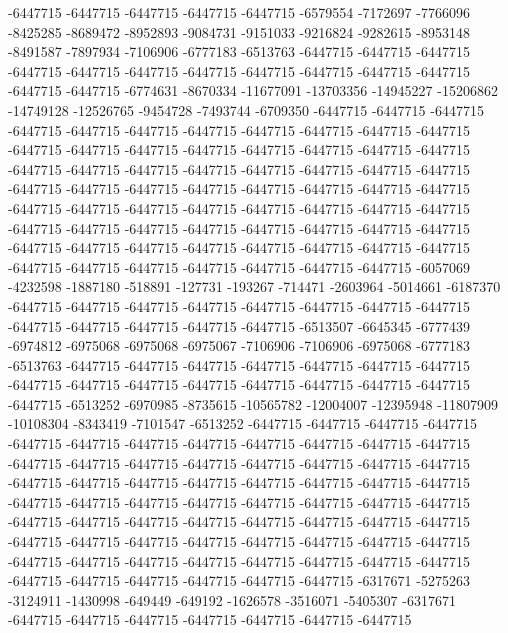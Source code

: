 -6447715 -6447715 -6447715 -6447715 -6447715 -6579554 -7172697 -7766096 -8425285 -8689472 -8952893 -9084731 -9151033 -9216824 -9282615 -8953148 -8491587 -7897934 -7106906 -6777183 -6513763 -6447715 -6447715 -6447715 -6447715 -6447715 -6447715 -6447715 -6447715 -6447715 -6447715 -6447715 -6447715 -6447715 -6774631 -8670334 -11677091 -13703356 -14945227 -15206862 -14749128 -12526765 -9454728 -7493744 -6709350 -6447715 -6447715 -6447715 -6447715 -6447715 -6447715 -6447715 -6447715 -6447715 -6447715 -6447715 -6447715 -6447715 -6447715 -6447715 -6447715 -6447715 -6447715 -6447715 -6447715 -6447715 -6447715 -6447715 -6447715 -6447715 -6447715 -6447715 -6447715 -6447715 -6447715 -6447715 -6447715 -6447715 -6447715 -6447715 -6447715 -6447715 -6447715 -6447715 -6447715 -6447715 -6447715 -6447715 -6447715 -6447715 -6447715 -6447715 -6447715 -6447715 -6447715 -6447715 -6447715 -6447715 -6447715 -6447715 -6447715 -6447715 -6447715 -6447715 -6447715 -6447715 -6447715 -6447715 -6447715 -6447715 -6447715 -6057069 -4232598 -1887180 -518891 -127731 -193267 -714471 -2603964 -5014661 -6187370 -6447715 -6447715 -6447715 -6447715 -6447715 -6447715 -6447715
-6447715 -6447715 -6447715 -6447715 -6447715 -6447715 -6513507 -6645345 -6777439 -6974812 -6975068 -6975068 -6975067 -7106906 -7106906 -6975068 -6777183 -6513763 -6447715 -6447715 -6447715 -6447715 -6447715 -6447715 -6447715 -6447715 -6447715 -6447715 -6447715 -6447715 -6447715 -6447715 -6447715 -6447715 -6513252 -6970985 -8735615 -10565782 -12004007 -12395948 -11807909 -10108304 -8343419 -7101547 -6513252 -6447715 -6447715 -6447715 -6447715 -6447715 -6447715 -6447715 -6447715 -6447715 -6447715 -6447715 -6447715 -6447715 -6447715 -6447715 -6447715 -6447715 -6447715 -6447715 -6447715 -6447715 -6447715 -6447715 -6447715 -6447715 -6447715 -6447715 -6447715 -6447715 -6447715 -6447715 -6447715 -6447715 -6447715 -6447715 -6447715 -6447715 -6447715 -6447715 -6447715 -6447715 -6447715 -6447715 -6447715 -6447715 -6447715 -6447715 -6447715 -6447715 -6447715 -6447715 -6447715 -6447715 -6447715 -6447715 -6447715 -6447715 -6447715 -6447715 -6447715 -6447715 -6447715 -6447715 -6447715 -6447715 -6447715 -6317671 -5275263 -3124911 -1430998 -649449 -649192 -1626578 -3516071 -5405307 -6317671 -6447715 -6447715 -6447715 -6447715 -6447715 -6447715 -6447715
